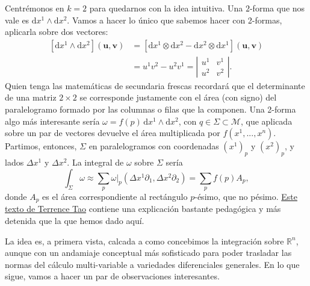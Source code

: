 Centrémonos en \(k=2\) para quedarnos con la idea intuitiva. Una \(2\)-forma que nos vale es \(\mathrm{d}x^1\wedge\mathrm{d}x^2\). Vamos a hacer lo único que sabemos hacer con 2-formas, aplicarla sobre dos vectores:
\begin{align}
    \nonumber
    \left[\mathrm{d}x^1\wedge\mathrm{d}x^2\right](\mathbf{u},\mathbf{v}) &= \left[\mathrm{d}x^1\otimes\mathrm{d}x^2 - \mathrm{d}x^2\otimes\mathrm{d}x^1\right](\mathbf{u},\mathbf{v})\\
    &= u^1 v^2 - u^2v^1 = 
    \left|\begin{matrix}
        u^1 & v^1 \\ u^2 & v^2
    \end{matrix}
    \right|.
\end{align}
Quien tenga las matemáticas de secundaria frescas recordará que el determinante de una matriz \(2\times 2\) se corresponde justamente con el área (con signo) del paralelogramo formado por las columnas o filas que la componen. Una 2-forma algo más interesante sería \(\omega = f(p)\, \mathrm{d}x^1\wedge\mathrm{d}x^2\), con \(q\in\Sigma\subset\mathcal{M}\), que aplicada sobre un par de vectores devuelve el área multiplicada por \(f(x^1,...,x^n)\). Partimos, entonces, \(\Sigma\) en paralelogramos con coordenadas \((x^1)_p\) y \((x^2)_p\), y lados \(\Delta x^1\) y \(\Delta x^2\). La integral de \(\omega\) sobre \(\Sigma\) sería
\begin{equation}
    \int_\Sigma\omega \approx \sum_p \omega|_p(\Delta x^1 \partial_1, \Delta x^2 \partial_2) = \sum_p f(p) A_p,
\end{equation}
donde \(A_p\) es el área correspondiente al rectángulo \(p\)-ésimo, que no pésimo. \href{https://www.math.ucla.edu/~tao/preprints/forms.pdf}{Este texto de Terrence Tao} contiene una explicación bastante pedagógica y más detenida que la que hemos dado aquí.

La idea es, a primera vista, calcada a como concebimos la integración sobre \(\mathbb{R}^n\), aunque con un andamiaje conceptual más sofisticado para poder trasladar las normas del cálculo multi-variable a variedades diferenciales generales. En lo que sigue, vamos a hacer un par de observaciones interesantes. 

